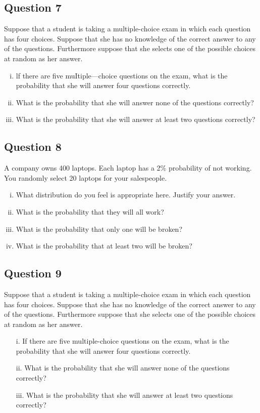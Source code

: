 \documentclass[]{report}
\begin{document}
\subsection*{Question 7}
Suppose that a student is taking a multiple-choice exam in which each question has four choices.
Suppose that she has no knowledge of the correct answer to any of the questions. Furthermore suppose that she selects one of the possible choices at random as her answer.
\begin{enumerate}[(i)]
\item lf there are five muItiple—choice questions on the exam, what is the probability that she will answer four questions correctly.
\item What is the probability that she will answer none of the questions correctly?
\item What is the probability that she will answer at least two questions correctly?
\end{enumerate}




\subsection*{Question 8}
A company owns 400 laptops. Each laptop has a 2\% probability of not working. You randomly select 20 laptops for your salespeople.
\begin{enumerate}[(i)]
\item What distribution do you feel is appropriate here. Justify your answer. 
\item What is the probability that they will all work?
\item What is the probability that only one will be broken?
\item What is the probability that at least two will be broken? 
\end{enumerate}


\subsection*{Question 9}
Suppose that a student is taking a multiple-choice exam in which each question has four choices.
Suppose that she has no knowledge of the correct answer to any of the questions. Furthermore suppose that she selects one of the possible choices at random as her answer.
\begin{itemize}
\item [i.] If there are five multiple-choice questions on the exam, what is the probability that she will answer four questions correctly.
\item [ii.] What is the probability that she will answer none of the questions correctly?
\item [iii.] What is the probability that she will answer at least two questions correctly?
\end{itemize}
\end{document}

